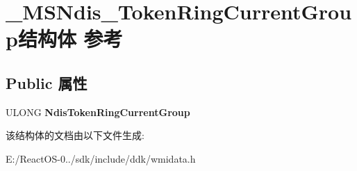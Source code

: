\hypertarget{struct___m_s_ndis___token_ring_current_group}{}\section{\+\_\+\+M\+S\+Ndis\+\_\+\+Token\+Ring\+Current\+Group结构体 参考}
\label{struct___m_s_ndis___token_ring_current_group}
\subsection*{Public 属性}
\begin{DoxyCompactItemize}
\item 
\mbox{\label{struct___m_s_ndis___token_ring_current_group_aad946c267ae3a9778ae66785c1bd9db8}} 
U\+L\+O\+NG {\bfseries Ndis\+Token\+Ring\+Current\+Group}
\end{DoxyCompactItemize}


该结构体的文档由以下文件生成\+:\begin{DoxyCompactItemize}
\item 
E\+:/\+React\+O\+S-\/0../sdk/include/ddk/wmidata.\+h\end{DoxyCompactItemize}
